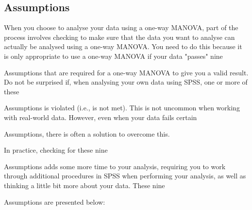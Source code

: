 \subsection{Assumptions}
When you choose to analyse your data using a one-way MANOVA, part of the process involves checking to make sure that the data you want to analyse can actually be analysed using a one-way MANOVA. You need to do this because it is only appropriate to use a one-way MANOVA if your data "passes" nine \item Assumptions that are required for a one-way MANOVA to give you a valid result. Do not be surprised if, when analysing your own data using SPSS, one or more of these \item Assumptions is violated (i.e., is not met). This is not uncommon when working with real-world data. However, even when your data fails certain \item Assumptions, there is often a solution to overcome this.

In practice, checking for these nine \item Assumptions adds some more time to your analysis, requiring you to work through additional procedures in SPSS when performing your analysis, as well as thinking a little bit more about your data. These nine \item Assumptions are presented below:

